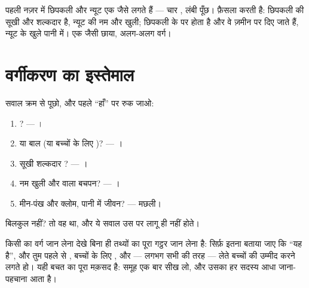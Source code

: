 \begin{remark}[सरीसृप या उभयचर?]\label{rem:g4:classifying-animals:confusion}
पहली नज़र में छिपकली और न्यूट एक जैसे लगते हैं --- चार , लंबी
पूँछ। फ़ैसला  करती है: छिपकली की सूखी और शल्कदार है, न्यूट की नम
और खुली; छिपकली के  पर  होता है और वे ज़मीन पर दिए जाते हैं,
न्यूट के खुले  पानी में। एक जैसी छाया, अलग-अलग वर्ग।
\end{remark}

\section{वर्गीकरण का इस्तेमाल}

\begin{method}\label{met:g4:classifying-animals:place}
सवाल क्रम से पूछो, और पहले ``हाँ'' पर रुक जाओ:
\begin{enumerate}
  \item {}? --- ।
  \item {} या बाल (या बच्चों के लिए )? --- ।
  \item सूखी शल्कदार ? --- ।
  \item नम खुली  और  वाला बचपन? --- ।
  \item मीन-पंख और क्लोम, पानी में जीवन? --- मछली।
\end{enumerate}
 बिलकुल नहीं? तो वह  था, और ये सवाल उस पर लागू ही नहीं
होते।
\end{method}

\begin{proposition}[वर्ग जो मुफ़्त में बता देता है]\label{prop:g4:classifying-animals:free}
किसी  का वर्ग जान लेना देखे बिना ही तथ्यों का पूरा गट्ठर जान लेना
है: सिर्फ़ इतना बताया जाए कि ``यह  है'', और तुम पहले से ,
बच्चों के लिए , और --- लगभग सभी  की तरह --- 
लेते बच्चों की उम्मीद करने लगते हो। यही बचत  का पूरा मक़सद है:
समूह एक बार सीख लो, और उसका हर सदस्य आधा जाना-पहचाना आता है।
\end{proposition}
\admitted

